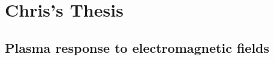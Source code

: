 



\section{Chris's Thesis}\label{part4}
\subsection{Plasma response to electromagnetic fields}
\label{chap:PlasmaSF}



